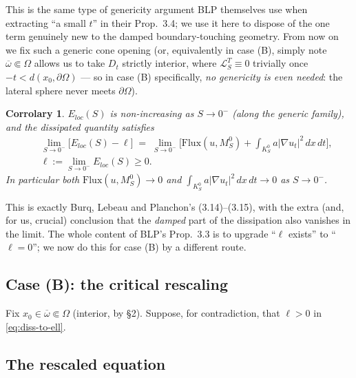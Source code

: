 \documentclass[11pt,letterpaper]{amsart}
\newtheorem{corollary}[theorem]{Corrolary}
\newcommand{\Om}{\Omega}
\begin{document}
This is the same type of genericity argument BLP \cite{BurqLebeauPlanchon} themselves use when extracting ``a small $t$'' in their Prop.\ 3.4; we use it here to dispose of the one term genuinely new to the damped boundary-touching geometry. From now on we fix such a generic cone opening (or, equivalently in case (B), simply note $\overline\omega\Subset\Om$ allows us to take $D_t$ strictly interior, where $\mathcal L_S^T\equiv0$ trivially once $-t<d(x_0,\partial\Om)$ --- so in case (B) specifically, \emph{no genericity is even needed}: the lateral sphere never meets $\partial\Om$).
\begin{corollary}\label{cor:monotone}
$E_{loc}(S)$ is non-increasing as $S\to0^-$ (along the generic family), and the dissipated quantity satisfies
\begin{eqnarray}\label{eq:diss-to-ell}
&&\lim_{S\to0^-} \Big[E_{loc}(S) - \ell\Big] \;=\; \lim_{S\to0^-}\Big[\mathrm{Flux}(u,M_S^0) + \int_{K_S^0} a|\nabla u_t|^2\,dx\,dt\Big],\\ &&\ell:=\lim_{S\to0^-}E_{loc}(S)\ge0.\nonumber
\end{eqnarray}
In particular both $\mathrm{Flux}(u,M_S^0)\to0$ and $\int_{K_S^0} a|\nabla u_t|^2\,dx\,dt\to0$ as $S\to0^-$.
\end{corollary}

This is exactly Burq, Lebeau and Planchon's (3.14)--(3.15), with the extra (and, for us, crucial) conclusion that the \emph{damped} part of the dissipation also vanishes in the limit. The whole content of BLP's Prop.\ 3.3 is to upgrade ``$\ell$ exists'' to ``$\ell=0$''; we now do this for case (B) by a different route.

\subsection{Case (B): the critical rescaling}

Fix $x_0\in\overline\omega\Subset\Om$ (interior, by \S2). Suppose, for contradiction, that $\ell>0$ in \eqref{eq:diss-to-ell}.

\subsection{The rescaled equation}
\end{document}
